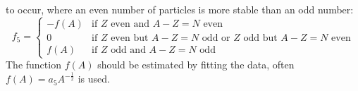 \begin{itemize}
        to occur, where an even number of particles is more stable than an odd number:
      \begin{equation}
          f_5   =
          \begin{cases}
              -f(A) & \text{if $Z$ even and $A-Z=N$ even}\\
              0     & \text{if $Z$ even but $A-Z=N$ odd or $Z$ odd but $A-Z=N$ even}\\
              f(A)  & \text{if $Z$ odd and $A-Z=N$ odd}
          \end{cases}
          \label{eq:pair}
      \end{equation}
      The function $f(A)$ should be estimated by fitting the data, 
      often $f(A) = a_5 A^{-\frac{1}{2}}$ is used.
\end{itemize}

